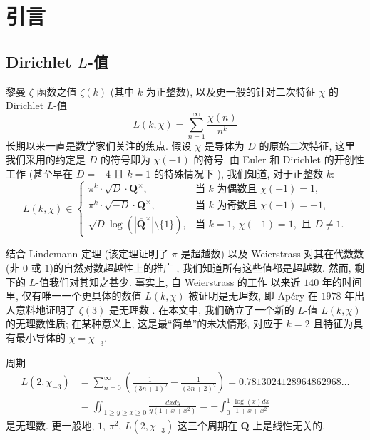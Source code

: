 \setcounter{footnote}{0}
\section{引言}\label{sec:1}

\subsection{Dirichlet $L$-值}\label{sec:1.1}

黎曼 $\zeta$ 函数之值 $\zeta(k)$ (其中 $k$ 为正整数), 
以及更一般的针对二次特征 $\chi$ 的 Dirichlet $L$-值
\[ L(k,\chi) = \sum_{n=1}^{\infty} \frac{\chi(n)}{n^k} \]
长期以来一直是数学家们关注的焦点.
假设 $\chi$ 是导体为 $D$ 的原始二次特征, 这里我们采用的约定是 $D$ 的符号即为 $\chi(-1)$ 的符号.
由 Euler \cite{Eul1735} 和 Dirichlet \cite{Dir1837} 的开创性工作
(甚至早在 $D = -4$ 且 $k = 1$ 的特殊情况下 \cite{Roy90}), 我们知道, 对于正整数 $k$:
\begin{equation}\label{eq:1.1.1}
L(k,\chi) \in \begin{cases} \pi^k \cdot \sqrt{D} \cdot \mathbf{Q}^{\times}, & \text{当 } k \text{ 为偶数且 } \chi(-1) = 1, \\ \pi^k \cdot \sqrt{-D} \cdot \mathbf{Q}^{\times}, & \text{当 } k \text{ 为奇数且 } \chi(-1) = -1, \\ \sqrt{D} \log \left( |\overline{\mathbf{Q}}^{\times}| \setminus \{1\} \right), & \text{当 } k = 1, \ \chi(-1) = 1, \text{ 且 } D \neq 1. \end{cases}
\end{equation}

结合 Lindemann 定理 \cite{Lin1882} (该定理证明了 $\pi$ 是超越数) 
以及 Weierstrass 对其在代数数(非 $0$ 或 $1$)的自然对数超越性上的推广 \cite{Wei1885}, 
我们知道所有这些值都是超越数.
然而, 剩下的 $L$-值我们对其知之甚少.
事实上, 自 Weierstrass 的工作 \cite{Wei1885} 以来近 $140$ 年的时间里, 
仅有唯一一个更具体的数值 $L(k, \chi)$ 被证明是无理数, 
即 Ap{\'e}ry 在 $1978$ 年出人意料地证明了 $\zeta(3)$ 是无理数 \cite{Ape79}\cite{vdP79}\cite{Coh78}.
在本文中, 我们确立了一个新的 $L$-值 $L(k, \chi)$ 的无理数性质;
在某种意义上, 这是最``简单''的未决情形, 对应于 $k = 2$ 且特征为具有最小导体的 $\chi = \chi_{-3}$.

\begin{maintheorem}\label{thm:A}
周期
\begin{align*}
L(2,\chi_{-3}) &= \sum_{n=0}^{\infty} \left( \frac{1}{(3n+1)^2} - \frac{1}{(3n+2)^2} \right) = 0.7813024128964862968 \dots \\
&= \iint_{1 \ge y \ge x \ge 0} \frac{dxdy}{y(1+x+x^2)} = -\int_0^1 \frac{\log(x)dx}{1+x+x^2}
\end{align*}
是无理数.
更一般地, $1$, $\pi^2$, $L(2, \chi_{-3})$ 这三个周期在 $\mathbf{Q}$ 上是线性无关的.
\end{maintheorem}

